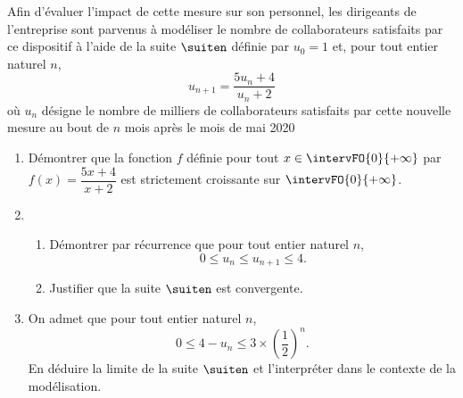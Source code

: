 \medskip

Afin d’évaluer l’impact de cette mesure sur son personnel, les dirigeants de l’entreprise sont parvenus à modéliser le nombre de collaborateurs satisfaits par ce dispositif à l’aide de la suite $\suiten$ définie par $u_0=1$ et, pour tout entier naturel $n$, \[ u_{n+1} = \dfrac{5u_n+4}{u_n+2} \]%
où $u_n$ désigne le nombre de milliers de collaborateurs satisfaits par cette nouvelle mesure au bout de $n$ mois après le mois de mai 2020

\begin{enumerate}
	\item Démontrer que la fonction $f$ définie pour tout $x \in \intervFO{0}{+\infty}$ par $f(x)=\dfrac{5x+4}{x+2}$ est strictement croissante sur $\intervFO{0}{+\infty}$.
	\item 
	\begin{enumerate}
		\item Démontrer par récurrence que pour tout entier naturel $n$, \[ 0 \leqslant u_n \leqslant u_{n+1} \leqslant 4. \]
		\item Justifier que la suite $\suiten$ est convergente.
	\end{enumerate}
	\item On admet que pour tout entier naturel $n$, \[ 0 \leqslant 4-u_n \leqslant 3 \times \left( \dfrac12\right)^n. \]%
	En déduire la limite de la suite $\suiten$ et l’interpréter dans le contexte de la modélisation.
\end{enumerate}

